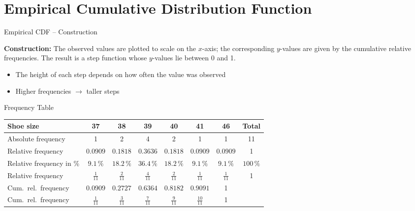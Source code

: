 \documentclass[aspectratio=169,11pt]{beamer}
\begin{document}



\section[ECDF]{Empirical Cumulative Distribution Function}
\begin{frame}{Empirical CDF -- Construction}

  \textbf{Construction:} The observed values are plotted to scale on the $x$-axis; the corresponding $y$-values are given by the cumulative relative frequencies. The result is a step function whose $y$-values lie between 0 and 1.

  \vspace{0.3cm}

  \begin{itemize}
    \item The height of each step depends on how often the value was observed
    \item Higher frequencies $\to$ taller steps
  \end{itemize}
\end{frame}

\begin{frame}{Frequency Table}
  \begin{center}
    \renewcommand{\arraystretch}{1.2}
    \begin{tabular}{lccccccc}
      \toprule
      Shoe size & 37 & 38 & 39 & 40 & 41 & 46 & Total \\
      \midrule
      Absolute frequency & 1 & 2 & 4 & 2 & 1 & 1 & 11 \\
      Relative frequency & $0.0909$ & $0.1818$ & $0.3636$ & $0.1818$ & $0.0909$ & $0.0909$ & 1 \\
      Relative frequency in \% & $9.1\,\%$ & $18.2\,\%$ & $36.4\,\%$ & $18.2\,\%$ & $9.1\,\%$ & $9.1\,\%$ & $100\,\%$ \\
      Relative frequency & $\tfrac{1}{11}$ & $\tfrac{2}{11}$ & $\tfrac{4}{11}$ & $\tfrac{2}{11}$ & $\tfrac{1}{11}$ & $\tfrac{1}{11}$ & 1 \\
      Cum.\ rel.\ frequency & $0.0909$ & $0.2727$ & $0.6364$ & $0.8182$ & $0.9091$ & 1 & \\
      Cum.\ rel.\ frequency & $\tfrac{1}{11}$ & $\tfrac{3}{11}$ & $\tfrac{7}{11}$ & $\tfrac{9}{11}$ & $\tfrac{10}{11}$ & 1 & \\
      \bottomrule
    \end{tabular}
  \end{center}
\end{frame}
\end{document}
